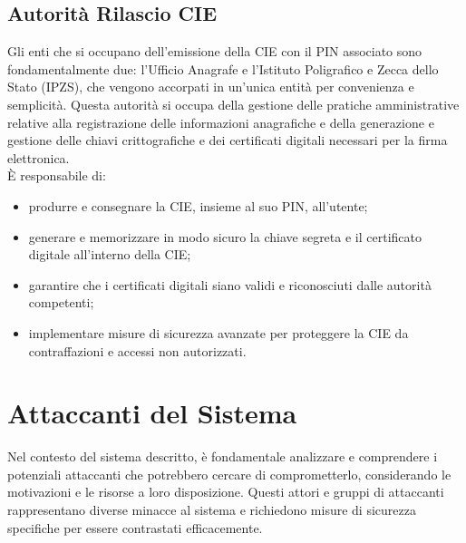         \subsection{Autorità Rilascio CIE}
            Gli enti che si occupano dell'emissione della CIE con il PIN associato sono fondamentalmente due: l'Ufficio Anagrafe e l'Istituto Poligrafico e Zecca dello Stato (IPZS), che vengono accorpati in un'unica entità per convenienza e semplicità. Questa autorità si occupa della gestione delle pratiche amministrative relative alla registrazione delle informazioni anagrafiche e della generazione e gestione delle chiavi crittografiche e dei certificati digitali necessari per la firma elettronica. \\
            È responsabile di:
                \begin{itemize}        
                    \item produrre e consegnare la CIE, insieme al suo PIN, all'utente;
                
                    \item generare e memorizzare in modo sicuro la chiave segreta e il certificato digitale all'interno della CIE;
    
                    \item garantire che i certificati digitali siano validi e riconosciuti dalle autorità competenti;
    
                    \item implementare misure di sicurezza avanzate per proteggere la CIE da contraffazioni e accessi non autorizzati.
                \end{itemize}


    \section{Attaccanti del Sistema}
        Nel contesto del sistema descritto, è fondamentale analizzare e comprendere i potenziali attaccanti che potrebbero cercare di comprometterlo, considerando le motivazioni e le risorse a loro disposizione.
        Questi attori e gruppi di attaccanti rappresentano diverse minacce al sistema e richiedono misure di sicurezza specifiche per essere contrastati efficacemente.
    
